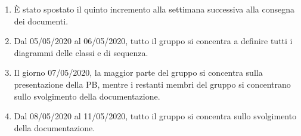 \documentclass{article}
\begin{document}
\begin{enumerate}
  \item È stato spostato il quinto incremento alla settimana successiva alla consegna dei documenti.
  \item Dal 05/05/2020 al 06/05/2020, tutto il gruppo si concentra a definire tutti i diagrammi delle classi e di sequenza.
  \item Il giorno 07/05/2020, la maggior parte del gruppo si concentra sulla presentazione della PB, mentre i restanti membri del gruppo si concentrano sullo svolgimento della documentazione.
  \item Dal 08/05/2020 al 11/05/2020, tutto il gruppo si concentra sullo svolgimento della documentazione. 
\end{enumerate}

\end{document}
